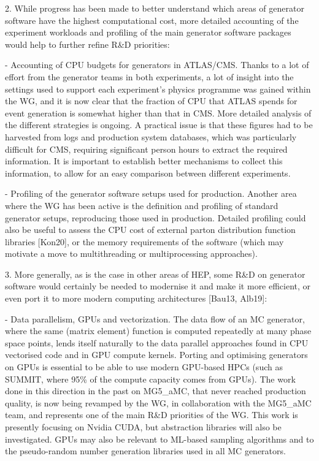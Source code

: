 \documentclass[10pt,a4paper]{article}
\begin{document}
2. While progress has been made to better understand which areas of
generator software have the highest computational cost, more detailed
accounting of the experiment workloads and profiling of the main
generator software packages would help to further refine R\&D
priorities:

- {Accounting of CPU budgets for generators in ATLAS/CMS}. Thanks to a
lot of effort from the generator teams in both experiments, a lot of
insight into the settings used to support each experiment's physics
programme was gained within the WG, and it is now clear that the
fraction of CPU that ATLAS spends for event generation is somewhat
higher than that in CMS. More detailed analysis of the different
strategies is ongoing. A practical issue is that these figures had to be
harvested from logs and production system databases, which was
particularly difficult for CMS, requiring significant person hours to
extract the required information. It is important to establish better
mechanisms to collect this information, to allow for an easy comparison
between different experiments.

- {Profiling of the generator software setups used for production}.
Another area where the WG has been active is the definition and
profiling of standard generator setups, reproducing those used in
production. Detailed profiling could also be useful to assess the CPU
cost of external parton distribution function libraries {[}Kon20{]}, or
the memory requirements of the software (which may motivate a move to
multithreading or multiprocessing approaches).

3. More generally, as is the case in other areas of HEP, some R\&D on
generator software would certainly be needed to modernise it and make it
more efficient, or even port it to more modern computing architectures
{[}Bau13, Alb19{]}:

- {Data parallelism, GPUs and vectorization}. The data flow of an MC
generator, where the same (matrix element) function is computed
repeatedly at many phase space points, lends itself naturally to the
data parallel approaches found in CPU vectorised code and in GPU compute
kernels. Porting and optimising generators on GPUs is essential to be
able to use modern GPU-based HPCs (such as SUMMIT, where 95\% of the
compute capacity comes from GPUs). The work done in this direction in
the past on MG5\_aMC, that never reached production quality, is now
being revamped by the WG, in collaboration with the MG5\_aMC team, and
represents one of the main R\&D priorities of the WG. This work is
presently focusing on Nvidia CUDA, but abstraction libraries will also
be investigated. GPUs may also be relevant to ML-based sampling
algorithms and to the pseudo-random number generation libraries used in
all MC generators.
\end{document}
